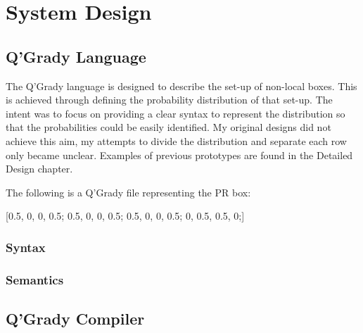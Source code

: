 \documentclass[report.tex]{subfiles}
\begin{document}
\chapter{System Design} %
\label{cha:system_design}
\section{Q'Grady Language} %
\label{sec:q_grady_language}
The Q'Grady language is designed to describe the set-up of non-local boxes. This
is achieved through defining the probability distribution of that set-up. The
intent was to focus on providing a clear syntax to represent the distribution so
that the probabilities could be easily identified. My original designs did not
achieve this aim, my attempts to divide the distribution and separate each row 
only became unclear. Examples of previous prototypes are found in the Detailed
Design chapter.

The following is a Q'Grady file representing the PR box:
\begin{center}
[0.5, 0, 0, 0.5; 0.5, 0, 0, 0.5; 0.5, 0, 0, 0.5; 0, 0.5, 0.5, 0;]
\end{center}

\subsection{Syntax} %
\label{sub:syntax}


\subsection{Semantics} %
\label{sec:semantics}


\section{Q'Grady Compiler} %
\label{sec:q_grady_compiler}

\newpage
\end{document}
